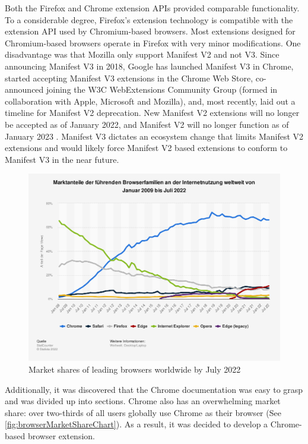 Both the Firefox and Chrome extension APIs provided comparable functionality. To a considerable degree, Firefox's extension technology is compatible with the extension API used by Chromium-based browsers. Most extensions designed for Chromium-based browsers operate in Firefox with very minor modifications. One disadvantage was that Mozilla only support Manifest V2 and not V3. Since announcing Manifest V3 in 2018, Google has launched Manifest V3 in Chrome, started accepting Manifest V3 extensions in the Chrome Web Store, co-announced joining the W3C WebExtensions Community Group (formed in collaboration with Apple, Microsoft and Mozilla), and, most recently, laid out a timeline for Manifest V2 deprecation. New Manifest V2 extensions will no longer be accepted as of January 2022, and Manifest V2 will no longer function as of January 2023 \autocite{alexei2021manifest}. Manifest V3 dictates an ecosystem change that limits Manifest V2 extensions and would likely force Manifest V2 based extensions to conform to Manifest V3 in the near future.

\begin{figure}[H]
  \includegraphics[width=\textwidth]{assets/statistic_id157944_marktanteile-fuehrender-browser-weltweit-bis-juli-2022.png}
  \caption{Market shares of leading browsers worldwide by July 2022}
  \label{fig:browserMarketShareChart}
\end{figure}

Additionally, it was discovered that the Chrome documentation was easy to grasp and was divided up into sections. Chrome also has an overwhelming market share: over two-thirds of all users globally use Chrome as their browser (See \autoref{fig:browserMarketShareChart}). As a result, it was decided to develop a Chrome-based browser extension.

